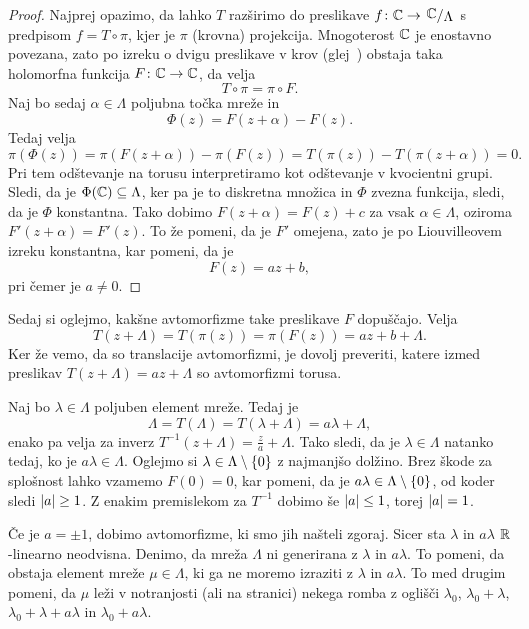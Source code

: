 \begin{proof}
Najprej opazimo, da lahko $T$ razširimo do preslikave
$f \colon \C \to \kvoc{\C}{\Lambda}$ s predpisom $f = T \circ \pi$,
kjer je $\pi$ (krovna) projekcija. Mnogoterost $\mathbb{C}$ je enostavno
povezana, zato po izreku o dvigu preslikave v krov
(glej~\cite[izrek~1.106]{Forstneric}) obstaja taka holomorfna
funkcija $F \colon \mathbb{C} \to \mathbb{C}$, da velja
\[
T \circ \pi = \pi \circ F.
\]
Naj bo sedaj $\alpha \in \Lambda$ poljubna točka mreže in
\[
\Phi(z) = F(z + \alpha) - F(z).
\]
Tedaj velja
\[
\pi(\Phi(z)) =
\pi(F(z + \alpha)) - \pi(F(z)) =
T(\pi(z)) - T(\pi(z + \alpha)) =
0.
\]
Pri tem odštevanje na torusu interpretiramo kot odštevanje v
kvocientni grupi. Sledi, da je $\Phi(\mathbb{C}) \subseteq \Lambda$, ker pa
je to diskretna množica in $\Phi$ zvezna funkcija, sledi, da je
$\Phi$ konstantna. Tako dobimo $F(z + \alpha) = F(z) + c$ za vsak
$\alpha \in \Lambda$, oziroma $F'(z + \alpha) = F'(z)$. To že
pomeni, da je $F'$ omejena, zato je po Liouvilleovem izreku
konstantna, kar pomeni, da je
\[
F(z) = az + b,
\]
pri čemer je $a \ne 0$.
\end{proof}

Sedaj si oglejmo, kakšne avtomorfizme take preslikave $F$
dopuščajo. Velja
\[
T(z + \Lambda) = T(\pi(z)) = \pi(F(z)) = az + b + \Lambda.
\]
Ker že vemo, da so translacije avtomorfizmi, je dovolj preveriti,
katere izmed preslikav $T(z + \Lambda) = az + \Lambda$ so
avtomorfizmi torusa.

Naj bo $\lambda \in \Lambda$ poljuben element mreže. Tedaj je
\[
\Lambda = T(\Lambda) = T(\lambda + \Lambda) = a\lambda + \Lambda,
\]
enako pa velja za inverz
$T^{-1}(z + \Lambda) = \frac{z}{a} + \Lambda$. Tako sledi, da je
$\lambda \in \Lambda$ natanko tedaj, ko je $a \lambda \in \Lambda$.
Oglejmo si $\lambda \in \Lambda \setminus \left\{0\right\}$ z najmanjšo
dolžino. Brez škode za splošnost lahko vzamemo $F(0) = 0$, kar
pomeni, da je $a \lambda \in \Lambda \setminus \left\{0\right\}$, od koder
sledi $\left\lvert a\right\rvert \geq 1$. Z enakim premislekom za $T^{-1}$ dobimo še
$\left\lvert a\right\rvert \leq 1$, torej $\left\lvert a\right\rvert = 1$.

Če je $a = \pm 1$, dobimo avtomorfizme, ki smo jih našteli zgoraj.
Sicer sta $\lambda$ in $a \lambda$ $\mathbb{R}$-linearno neodvisna. Denimo,
da mreža $\Lambda$ ni generirana z $\lambda$ in $a \lambda$. To
pomeni, da obstaja element mreže $\mu \in \Lambda$, ki ga ne moremo
izraziti z $\lambda$ in $a \lambda$. To med drugim pomeni, da $\mu$
leži v notranjosti (ali na stranici) nekega romba z oglišči
$\lambda_0$, $\lambda_0 + \lambda$,
$\lambda_0 + \lambda + a \lambda$ in $\lambda_0 + a \lambda$.

